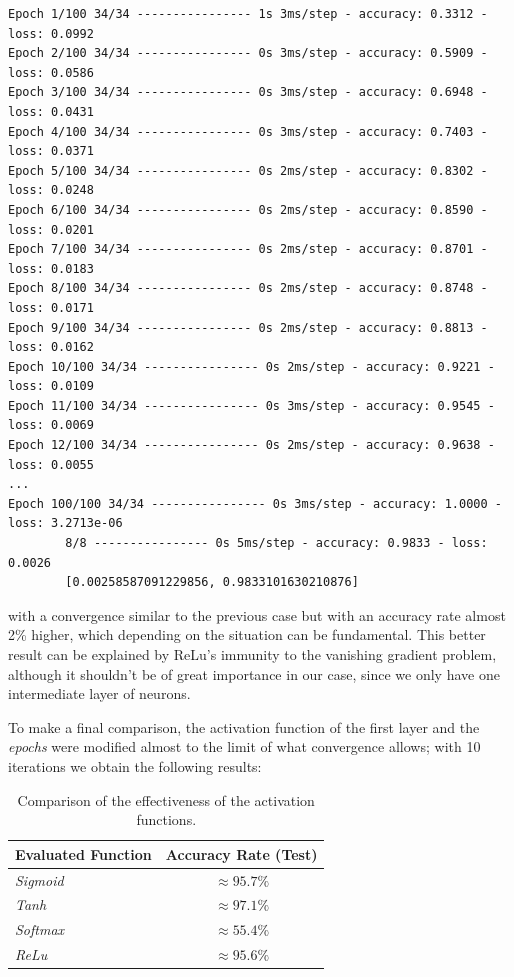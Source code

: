 \documentclass[11pt,a4paper]{article}
\begin{document}
{\footnotesize \begin{verbatim}
Epoch 1/100 34/34 ---------------- 1s 3ms/step - accuracy: 0.3312 - loss: 0.0992 
Epoch 2/100 34/34 ---------------- 0s 3ms/step - accuracy: 0.5909 - loss: 0.0586
Epoch 3/100 34/34 ---------------- 0s 3ms/step - accuracy: 0.6948 - loss: 0.0431
Epoch 4/100 34/34 ---------------- 0s 3ms/step - accuracy: 0.7403 - loss: 0.0371
Epoch 5/100 34/34 ---------------- 0s 2ms/step - accuracy: 0.8302 - loss: 0.0248
Epoch 6/100 34/34 ---------------- 0s 2ms/step - accuracy: 0.8590 - loss: 0.0201
Epoch 7/100 34/34 ---------------- 0s 2ms/step - accuracy: 0.8701 - loss: 0.0183
Epoch 8/100 34/34 ---------------- 0s 2ms/step - accuracy: 0.8748 - loss: 0.0171
Epoch 9/100 34/34 ---------------- 0s 2ms/step - accuracy: 0.8813 - loss: 0.0162
Epoch 10/100 34/34 ---------------- 0s 2ms/step - accuracy: 0.9221 - loss: 0.0109
Epoch 11/100 34/34 ---------------- 0s 3ms/step - accuracy: 0.9545 - loss: 0.0069
Epoch 12/100 34/34 ---------------- 0s 2ms/step - accuracy: 0.9638 - loss: 0.0055
...
Epoch 100/100 34/34 ---------------- 0s 3ms/step - accuracy: 1.0000 - loss: 3.2713e-06
        8/8 ---------------- 0s 5ms/step - accuracy: 0.9833 - loss: 0.0026  
        [0.00258587091229856, 0.9833101630210876]
\end{verbatim}}
\noindent with a convergence similar to the previous case but with an accuracy rate almost 2\% higher, which depending on the situation can be fundamental. This better result can be explained by ReLu's immunity to the vanishing gradient problem, although it shouldn't be of great importance in our case, since we only have one intermediate layer of neurons.

To make a final comparison, the activation function of the first layer and the \textit{epochs} were modified almost to the limit of what convergence allows; with 10 iterations we obtain the following results:

\begin{table}[h]
\centering
\begin{tabular}{@{}lc@{}}
\toprule
\textbf{Evaluated Function} & \textbf{Accuracy Rate (Test)} \\ \midrule
\textit{Sigmoid} & $\approx 95.7 \%$ \\
\textit{Tanh} & $\approx 97.1 \%$ \\
\textit{Softmax} & $\approx 55.4 \%$ \\
\textit{ReLu} & $\approx 95.6 \%$ \\ \bottomrule
\end{tabular}
\caption{Comparison of the effectiveness of the activation functions.}
\end{table}
\end{document}
